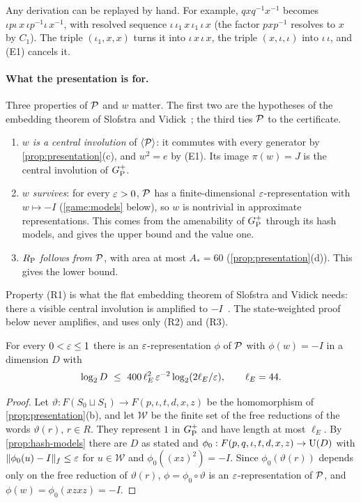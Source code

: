 Any derivation can be replayed by hand. For example, $qxq^{-1}x^{-1}$ becomes $\iota p\iota\,x\,\iota p^{-1}\iota\,x^{-1}$, with resolved
sequence $\iota\,\iota_1\,x\,\iota_1\,\iota\,x$ (the factor $pxp^{-1}$ resolves to $x$ by $C_1$). The triple $(\iota_1,x,x)$ turns it into
$\iota\,x\,\iota\,x$, the triple $(x,\iota,\iota)$ into $\iota\,\iota$, and (E1) cancels it.

\paragraph{What the presentation is for.} Three properties of $\mathcal P$ and $w$ matter. The first two are the hypotheses of the embedding
theorem of Slofstra and Vidick~\cite[Prop.~6.2]{SV18}; the third ties $\mathcal P$ to the certificate.
\begin{enumerate}[label=(R\arabic*),itemsep=1pt]
\item \emph{$w$ is a central involution} of $\langle\mathcal P\rangle$: it commutes with every generator by \cref{prop:presentation}(c), and
$w^2=e$ by (E1). Its image $\pi(w)=J$ is the central involution of $G_{\mathrm P}^{+}$.
\item \emph{$w$ survives}: for every $\varepsilon>0$, $\mathcal P$ has a finite-dimensional $\varepsilon$-representation with $w\mapsto-I$ (\cref{game:models}
below), so $w$ is nontrivial in approximate representations. This comes from the amenability of $G_{\mathrm P}^{+}$ through its hash models, and gives
the upper bound and the value one.
\item \emph{$R_{\mathrm P}$ follows from $\mathcal P$}, with area at most $A_*=60$ (\cref{prop:presentation}(d)). This gives the lower bound.
\end{enumerate}
Property (R1) is what the flat embedding theorem of Slofstra and Vidick needs: there a visible central involution is amplified to
$-I$~\cite[Prop.~2.7]{SV18}. The state-weighted proof below never amplifies, and uses only (R2) and (R3).

\begin{lemma}[$w$ survives]\label{game:models}
For every $0<\varepsilon\le1$ there is an $\varepsilon$-representation $\phi$ of $\mathcal P$ with $\phi(w)=-I$ in a dimension $D$ with
\[
\log_2D\ \le\ 400\,\ell_E^2\,\eps^{-2}\log_2(2\ell_E/\eps),\qquad\ell_E=44 .
\]
\end{lemma}

\begin{proof}
Let $\vartheta:F(S_0\sqcup S_1)\to F(p,\iota,t,d,x,z)$ be the homomorphism of \cref{prop:presentation}(b), and let $\mathcal W$ be the
finite set of the free reductions of the words $\vartheta(r)$, $r\in R$. They represent $1$ in $G_{\mathrm P}^{+}$ and have length at most $\ell_E$. By
\cref{prop:hash-models} there are $D$ as stated and $\phi_0:F(p,q,\iota,t,d,x,z)\to\mathrm U(D)$ with $\lVert \phi_0(u)-I\rVert_f\le\varepsilon$ for $u\in\mathcal W$
and $\phi_0((xz)^2)=-I$. Since $\phi_0(\vartheta(r))$ depends only on the free reduction of $\vartheta(r)$, $\phi=\phi_0\circ\vartheta$ is an
$\varepsilon$-representation of $\mathcal P$, and $\phi(w)=\phi_0(xzxz)=-I$.
\end{proof}

